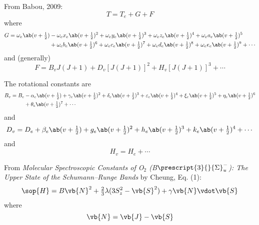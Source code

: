 \documentclass[11pt, twoside, fleqn]{report}
\newcommand{\state}[2]{\prescript{#1}{}{#2}}
\begin{document}
From Babou, 2009:
\begin{equation*}
    T = T_{e} + G + F
\end{equation*}
where
\begin{align*}
    G = \omega_{e}\ab(v + \tfrac{1}{2}) & - \omega_{e}x_{e}\ab(v + \tfrac{1}{2})^{2} + \omega_{e}y_{e}\ab(v + \tfrac{1}{2})^{3} + \omega_{e}z_{e}\ab(v + \tfrac{1}{2})^{4} + \omega_{e}a_{e}\ab(v + \tfrac{1}{2})^{5}          \\
                                        & + \omega_{e}b_{e}\ab(v + \tfrac{1}{2})^{6} + \omega_{e}c_{e}\ab(v + \tfrac{1}{2})^{7} + \omega_{e}d_{e}\ab(v + \tfrac{1}{2})^{8} + \omega_{e}e_{e}\ab(v + \tfrac{1}{2})^{9} + \dotsb
\end{align*}
and (generally)
\begin{equation*}
    F = B_{v}J(J + 1) + D_{v}[J(J + 1)]^{2} + H_{v}[J(J + 1)]^{3} + \dotsb
\end{equation*}

The rotational constants are
\begin{align*}
    B_{v} = B_{e} & - \alpha_{e}\ab(v + \tfrac{1}{2}) + \gamma_{e}\ab(v + \tfrac{1}{2})^{2} + \delta_{e}\ab(v + \tfrac{1}{2})^{3} + \varepsilon_{e}\ab(v + \tfrac{1}{2})^{4} + \xi_{e}\ab(v + \tfrac{1}{2})^{5} + \eta_{e}\ab(v + \tfrac{1}{2})^{6} \\
                  & + \theta_{e}\ab(v + \tfrac{1}{2})^{7} + \dotsb
\end{align*}
and
\begin{equation*}
    D_{v} = D_{e} + \beta_{e}\ab(v + \tfrac{1}{2}) + g_{e}\ab(v + \tfrac{1}{2})^{2} + h_{e}\ab(v + \tfrac{1}{2})^{3} + k_{e}\ab(v + \tfrac{1}{2})^{4} + \dotsb
\end{equation*}
and
\begin{equation*}
    H_{v} = H_{e} + \dotsb
\end{equation*}

From \textit{Molecular Spectroscopic Constants of O$_{2}$ (B$\state{3}{\Sigma}^{-}_{u}$): The Upper State of the Schumann--Runge Bands} by Cheung, Eq. (1):
\begin{equation*}
    \sop{H} = B\vb{N}^{2} + \tfrac{2}{3}\lambda(3S_{z}^{2} - \vb{S}^{2}) + \gamma\vb{N}\vdot\vb{S}
\end{equation*}
where
\begin{equation*}
    \vb{N} = \vb{J} - \vb{S}
\end{equation*}
\end{document}
